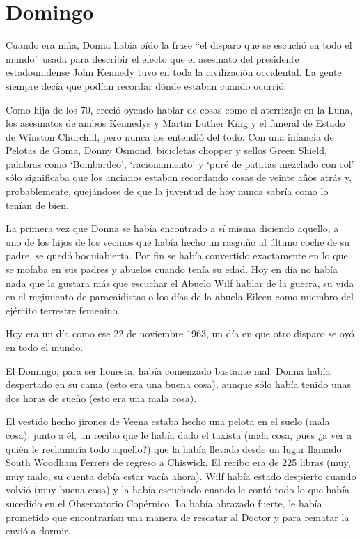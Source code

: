 \chapter*{Domingo}

Cuando era niña, Donna había oído la frase ``el disparo que se escuchó
en todo el mundo'' usada para describir el efecto que el asesinato del
presidente estadounidense John Kennedy tuvo en toda la civilización
occidental. La gente siempre decía que podían recordar dónde estaban
cuando ocurrió.

Como hija de los 70, creció oyendo hablar de cosas como el aterrizaje en
la Luna, los asesinatos de ambos Kennedys y Martin Luther King y el
funeral de Estado de Winston Churchill, pero nunca los entendió del
todo. Con una infancia de Pelotas de Goma, Donny Osmond, bicicletas
chopper y sellos Green Shield, palabras como `Bombardeo',
`racionamiento' y `puré de patatas mezclado con col' sólo significaba
que los ancianos estaban recordando cosas de veinte años atrás y,
probablemente, quejándose de que la juventud de hoy nunca sabría como lo
tenían de bien.

La primera vez que Donna se había encontrado a sí misma diciendo
aquello, a uno de los hijos de los vecinos que había hecho un rasguño al
último coche de su padre, se quedó boquiabierta. Por fin se había
convertido exactamente en lo que se mofaba en sus padres y abuelos
cuando tenía su edad. Hoy en día no había nada que la gustara más que
escuchar el Abuelo Wilf hablar de la guerra, su vida en el regimiento de
paracaidistas o los días de la abuela Eileen como miembro del ejército
terrestre femenino.

Hoy era un día como ese 22 de noviembre 1963, un día en que otro disparo
se oyó en todo el mundo.

El Domingo, para ser honesta, había comenzado bastante mal. Donna había
despertado en su cama (esto era una buena cosa), aunque sólo había
tenido unas dos horas de sueño (esto era una mala cosa).

El vestido hecho jirones de Veena estaba hecho una pelota en el suelo
(mala cosa); junto a él, un recibo que le había dado el taxista (mala
cosa, pues ¿a ver a quién le reclamaría todo aquello?) que la había
llevado desde un lugar llamado South Woodham Ferrers de regreso a
Chiswick. El recibo era de 225 libras (muy, muy malo, su cuenta debía
estar vacía ahora). Wilf había estado despierto cuando volvió (muy buena
cosa) y la había escuchado cuando le contó todo lo que había sucedido en
el Observatorio Copérnico. La había abrazado fuerte, le había prometido
que encontrarían una manera de rescatar al Doctor y para rematar la
envió a dormir.


